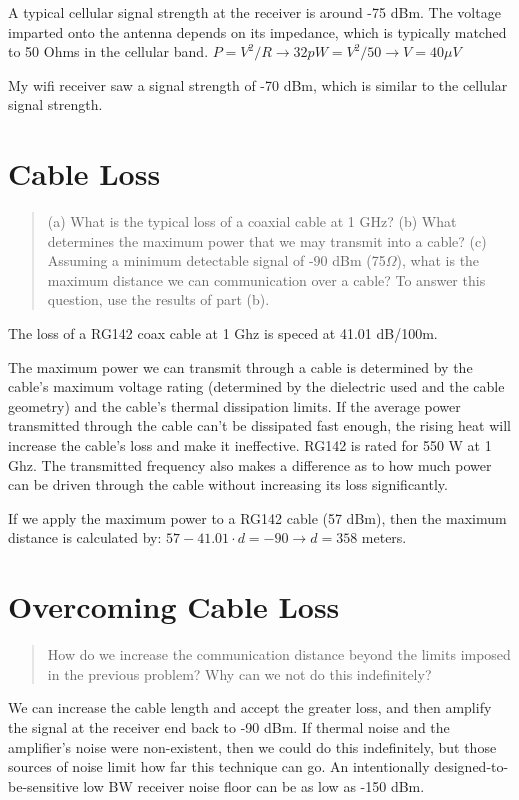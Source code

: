 \documentclass[11pt]{article}
\begin{document}
A typical cellular signal strength at the receiver is around -75 dBm. The voltage imparted onto the antenna depends on its impedance, which is typically matched to 50 Ohms in the cellular band. $P = V^2 / R \rightarrow 32pW = V^2 / 50 \rightarrow V = 40 \mu V$

My wifi receiver saw a signal strength of -70 dBm, which is similar to the cellular signal strength.

\section{Cable Loss}
\begin{quote}
(a) What is the typical loss of a coaxial cable at 1 GHz? (b) What determines the maximum power that we may transmit into a cable? (c) Assuming a minimum detectable signal of -90 dBm (75$\Omega$), what is the maximum distance we can communication over a cable? To answer this question, use the results of part (b).
\end{quote}

The loss of a RG142 coax cable at 1 Ghz is speced at 41.01 dB/100m.

The maximum power we can transmit through a cable is determined by the cable's maximum voltage rating (determined by the dielectric used and the cable geometry) and the cable's thermal dissipation limits. If the average power transmitted through the cable can't be dissipated fast enough, the rising heat will increase the cable's loss and make it ineffective. RG142 is rated for 550 W at 1 Ghz. The transmitted frequency also makes a difference as to how much power can be driven through the cable without increasing its loss significantly.

If we apply the maximum power to a RG142 cable (57 dBm), then the maximum distance is calculated by: $57 - 41.01 \cdot d = -90 \rightarrow d = 358$ meters.

\section{Overcoming Cable Loss}
\begin{quote}
	How do we increase the communication distance beyond the limits imposed in the previous problem? Why can we not do this indefinitely?
\end{quote}

We can increase the cable length and accept the greater loss, and then amplify the signal at the receiver end back to -90 dBm. If thermal noise and the amplifier's noise were non-existent, then we could do this indefinitely, but those sources of noise limit how far this technique can go. An intentionally designed-to-be-sensitive low BW receiver noise floor can be as low as -150 dBm.
\end{document}
